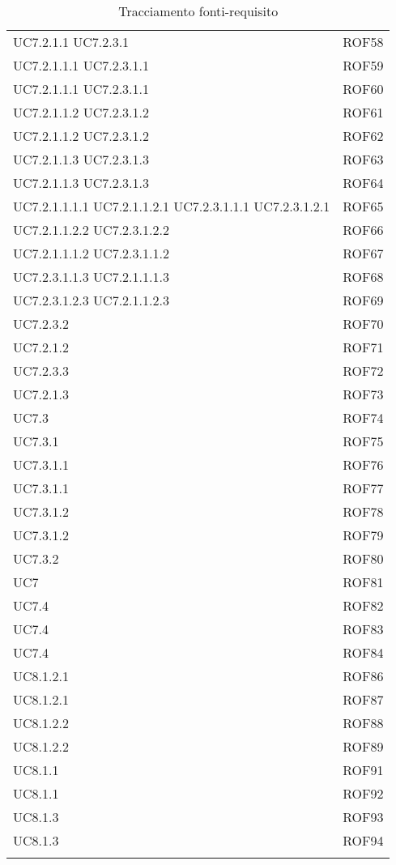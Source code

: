 \documentclass[../AnalisiDeiRequisiti_v3.0.0.tex]{subfiles}
\begin{document}
\begin{longtable}{p{4cm}!{\VRule[1pt]}p{4cm}}
UC7.2.1.1 UC7.2.3.1 & ROF58 \\
UC7.2.1.1.1 UC7.2.3.1.1 & ROF59 \\
UC7.2.1.1.1 UC7.2.3.1.1 & ROF60 \\
UC7.2.1.1.2 UC7.2.3.1.2 & ROF61 \\
UC7.2.1.1.2 UC7.2.3.1.2 & ROF62 \\
UC7.2.1.1.3 UC7.2.3.1.3 & ROF63 \\
UC7.2.1.1.3 UC7.2.3.1.3 & ROF64 \\
UC7.2.1.1.1.1 UC7.2.1.1.2.1 UC7.2.3.1.1.1 UC7.2.3.1.2.1 & ROF65 \\
UC7.2.1.1.2.2 UC7.2.3.1.2.2 & ROF66 \\
UC7.2.1.1.1.2 UC7.2.3.1.1.2 & ROF67 \\
UC7.2.3.1.1.3 UC7.2.1.1.1.3 & ROF68 \\
UC7.2.3.1.2.3 UC7.2.1.1.2.3 & ROF69 \\
UC7.2.3.2 & ROF70 \\
UC7.2.1.2 & ROF71 \\
UC7.2.3.3 & ROF72 \\
UC7.2.1.3 & ROF73 \\
UC7.3 & ROF74 \\
UC7.3.1 & ROF75 \\
UC7.3.1.1 & ROF76 \\
UC7.3.1.1 & ROF77 \\
UC7.3.1.2 & ROF78 \\
UC7.3.1.2 & ROF79 \\
UC7.3.2 & ROF80 \\
UC7 & ROF81 \\
UC7.4 & ROF82 \\
UC7.4 & ROF83 \\
UC7.4 & ROF84 \\
UC8.1.2.1 & ROF86 \\
UC8.1.2.1 & ROF87 \\
UC8.1.2.2 & ROF88 \\
UC8.1.2.2 & ROF89 \\
UC8.1.1 & ROF91 \\
UC8.1.1 & ROF92 \\
UC8.1.3 & ROF93 \\
UC8.1.3 & ROF94 \\

\caption{Tracciamento fonti-requisito}
\end{longtable}
		
\newpage
\end{document}
